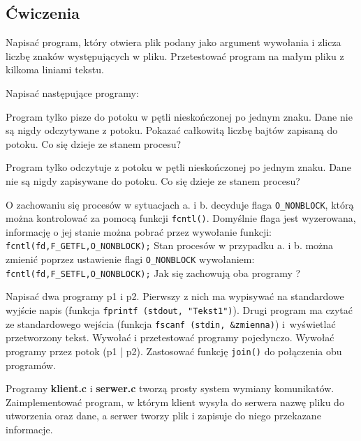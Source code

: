 \subsection{Ćwiczenia}
\label{sec:T9O59}

\begin{myenumerate}
  \item Napisać program, który otwiera plik podany jako argument wywołania i
    zlicza liczbę znaków występujących w pliku. Przetestować program na małym
    pliku z kilkoma liniami tekstu. 
  \item Napisać następujące programy:
    \begin{myenumerate}
      \item Program tylko pisze do potoku w pętli nieskończonej po jednym
        znaku. Dane nie są nigdy odczytywane z potoku. Pokazać całkowitą liczbę
        bajtów zapisaną do potoku. Co się dzieje ze stanem procesu?
      \item Program tylko odczytuje z potoku w pętli nieskończonej po jednym
        znaku. Dane nie są nigdy zapisywane do potoku. Co się dzieje ze stanem
        procesu?
      \item O zachowaniu się procesów w sytuacjach a. i b. decyduje flaga
        \texttt{O\_NONBLOCK}, którą można kontrolować za pomocą funkcji
        \texttt{fcntl()}. Domyślnie flaga jest wyzerowana, informację o jej
        stanie można pobrać przez wywołanie funkcji:
        \texttt{fcntl(fd,F\_GETFL,O\_NONBLOCK);} Stan procesów w przypadku a. i
        b. można zmienić poprzez ustawienie flagi \texttt{O\_NONBLOCK}
        wywołaniem: \texttt{fcntl(fd,F\_SETFL,O\_NONBLOCK);} Jak się
        zachowują oba programy ? 
    \end{myenumerate}
    \item Napisać dwa programy p1 i p2. Pierwszy z nich ma wypisywać na
      standardowe wyjście napis (funkcja \texttt{fprintf (stdout, "Tekst1")}).
      Drugi program ma czytać ze standardowego wejścia (funkcja \texttt{fscanf
      (stdin, \&zmienna)}) i wyświetlać przetworzony tekst. Wywołać i przetestować
      programy pojedynczo. Wywołać programy przez potok (p1 | p2). Zastosować
      funkcję \texttt{join()} do połączenia obu programów. 
    \item Programy \textbf{klient.c} i \textbf{serwer.c} tworzą prosty system
      wymiany komunikatów. Zaimplementować program, w którym klient wysyła do
      serwera nazwę pliku do utworzenia oraz dane, a serwer tworzy plik i
      zapisuje do niego przekazane informacje.
\end{myenumerate}

